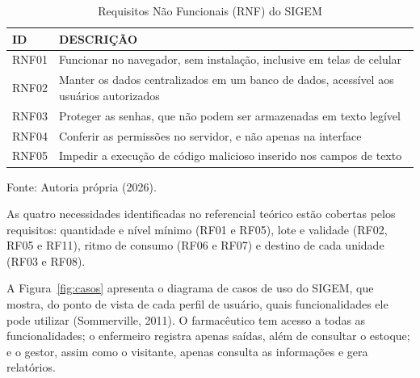 \documentclass[12pt,a4paper]{article}
\begin{document}
\begin{table}[!htbp]
  \centering
  \caption{Requisitos Não Funcionais (RNF) do SIGEM}
  \label{tb:rnf}
  \small
  \renewcommand{\arraystretch}{1.15}
  \begin{tabularx}{\textwidth}{|l|X|}
    \hline
    \textbf{ID} & \textbf{DESCRIÇÃO} \\ \hline
    RNF01 & Funcionar no navegador, sem instalação, inclusive em telas de celular \\ \hline
    RNF02 & Manter os dados centralizados em um banco de dados, acessível aos usuários autorizados \\ \hline
    RNF03 & Proteger as senhas, que não podem ser armazenadas em texto legível \\ \hline
    RNF04 & Conferir as permissões no servidor, e não apenas na interface \\ \hline
    RNF05 & Impedir a execução de código malicioso inserido nos campos de texto \\ \hline
  \end{tabularx}
  \par\smallskip
  {\small Fonte: Autoria própria (2026).}
\end{table}

As quatro necessidades identificadas no referencial teórico estão cobertas pelos requisitos: quantidade e nível mínimo (RF01 e RF05), lote e validade (RF02, RF05 e RF11), ritmo de consumo (RF06 e RF07) e destino de cada unidade (RF03 e RF08).

A Figura~\ref{fig:casos} apresenta o diagrama de casos de uso do SIGEM, que mostra, do ponto de vista de cada perfil de usuário, quais funcionalidades ele pode utilizar (Sommerville, 2011). O farmacêutico tem acesso a todas as funcionalidades; o enfermeiro registra apenas saídas, além de consultar o estoque; e o gestor, assim como o visitante, apenas consulta as informações e gera relatórios.
\end{document}
